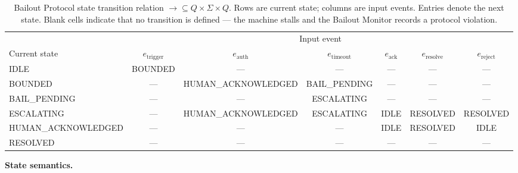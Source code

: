 \begin{table}[htbp]
\caption{Bailout Protocol state transition relation $\rightarrow \subseteq Q \times \Sigma \times Q$. Rows are current state; columns are input events. Entries denote the next state. Blank cells indicate that no transition is defined --- the machine stalls and the Bailout Monitor records a protocol violation.}
\label{tab:bailout-transition}
\begin{tabular}{@{}lcccccc@{}}
\toprule
 & \multicolumn{6}{c}{Input event} \\
\cmidrule(l){2-7}
Current state & $e_{\text{trigger}}$ & $e_{\text{auth}}$ & $e_{\text{timeout}}$ & $e_{\text{ack}}$ & $e_{\text{resolve}}$ & $e_{\text{reject}}$ \\
\midrule
IDLE              & BOUNDED            & --- & --- & --- & --- & --- \\
BOUNDED           & --- & HUMAN\_ACKNOWLEDGED & BAIL\_PENDING & --- & --- & --- \\
BAIL\_PENDING     & --- & --- & ESCALATING & --- & --- & --- \\
ESCALATING        & --- & HUMAN\_ACKNOWLEDGED & ESCALATING & IDLE & RESOLVED & RESOLVED \\
HUMAN\_ACKNOWLEDGED & --- & --- & --- & IDLE & RESOLVED & IDLE \\
RESOLVED          & --- & --- & --- & --- & --- & --- \\
\bottomrule
\end{tabular}
\end{table}

\bigskip
\noindent\textbf{State semantics.}

